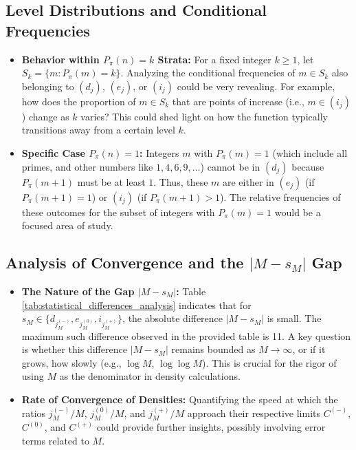 \documentclass[]{article}
\theoremstyle{plain}%
\theoremstyle{definition}
\theoremstyle{remark}
\begin{document}
\subsection{Level Distributions and Conditional Frequencies}
\begin{itemize}
	\item \textbf{Behavior within $P_{\pi}(n)=k$ Strata:} For a fixed integer $k \ge 1$, let $S_k = \{ m : P_{\pi}(m) = k \}$. Analyzing the conditional frequencies of $m \in S_k$ also belonging to $(d_j)$, $(e_j)$, or $(i_j)$ could be very revealing. For example, how does the proportion of $m \in S_k$ that are points of increase (i.e., $m \in (i_j)$) change as $k$ varies? This could shed light on how the function typically transitions away from a certain level $k$.
	\item \textbf{Specific Case $P_{\pi}(n)=1$:} Integers $m$ with $P_{\pi}(m)=1$ (which include all primes, and other numbers like $1, 4, 6, 9, \dots$) cannot be in $(d_j)$ because $P_{\pi}(m+1)$ must be at least $1$. Thus, these $m$ are either in $(e_j)$ (if $P_{\pi}(m+1)=1$) or $(i_j)$ (if $P_{\pi}(m+1)>1$). The relative frequencies of these outcomes for the subset of integers with $P_{\pi}(m)=1$ would be a focused area of study.
\end{itemize}

\subsection{Analysis of Convergence and the $|M-s_M|$ Gap}
\begin{itemize}
	\item \textbf{The Nature of the Gap $|M-s_M|$:} Table \ref{tab:statistical_differences_analysis} indicates that for $s_M \in \{d_{j^{(-)}_M}, e_{j^{(0)}_M}, i_{j^{(+)}_M}\}$, the absolute difference $|M-s_M|$ is small. The maximum such difference observed in the provided table is 11. A key question is whether this difference $|M-s_M|$ remains bounded as $M \to \infty$, or if it grows, how slowly (e.g., $\log M$, $\log \log M$). This is crucial for the rigor of using $M$ as the denominator in density calculations.
	\item \textbf{Rate of Convergence of Densities:} Quantifying the speed at which the ratios $j^{(-)}_M/M$, $j^{(0)}_M/M$, and $j^{(+)}_M/M$ approach their respective limits $C^{(-)}$, $C^{(0)}$, and $C^{(+)}$ could provide further insights, possibly involving error terms related to $M$.
\end{itemize}
\end{document}
